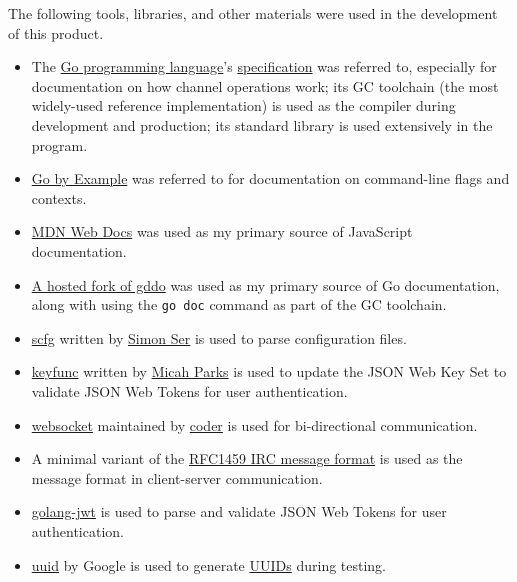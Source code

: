 The following tools, libraries, and other materials were used in the
development of this product.

\begin{itemize}
\item The \href{https://go.dev}{Go programming language}'s
\href{https://go.dev/ref/spec}{specification} was referred to,
especially for documentation on how channel operations work; its GC
toolchain (the most widely-used reference implementation) is used as
the compiler during development and production; its standard library
is used extensively in the program.

\item \href{https://gobyexample.com}{Go by Example} was referred to for
documentation on command-line flags and contexts.

\item \href{https://developer.mozilla.org/en-US/}{MDN Web Docs} was
used as my primary source of JavaScript documentation.

\item \href{https://godocs.io}{A hosted fork of gddo} was used as my
primary source of Go documentation, along with using the
\texttt{go doc} command as part of the GC toolchain.

\item \href{https://git.sr.ht/~emersion/go-scfg}{scfg}
written by \href{https://emersion.fr}{Simon Ser} is used to parse
configuration files.

\item \href{https://github.com/MicahParks/keyfunc}{keyfunc}
written by \href{https://micahparks.com/}{Micah Parks} is used to
update the JSON Web Key Set to validate JSON Web Tokens for user
authentication.

\item \href{https://github.com/coder/websocket}{websocket} maintained
by \href{https://coder.com/}{coder} is used for bi-directional
communication.

\item A minimal variant of the
\href{https://www.rfc-editor.org/rfc/rfc1459#section-2.3}{RFC1459
IRC message format} is used as the message format in client-server
communication.

\item \href{https://github.com/golang-jwt/jwt}{golang-jwt} is used to
parse and validate JSON Web Tokens for user authentication.

\item \href{https://github.com/google/uuid}{uuid} by Google is used to
generate
\href{https://www.rfc-editor.org/rfc/rfc9562.html}{UUIDs}
during testing.


\end{itemize}
